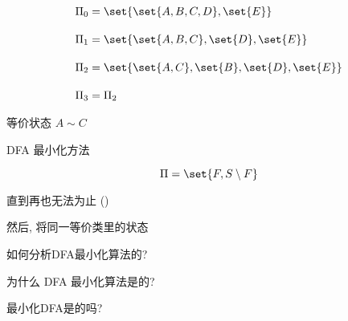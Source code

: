\begin{frame}{}
  \begin{align*}
    \Pi_{0} &= \set{\set{A, B, C, D}, \set{E}} \\[10pt]
    \Pi_{1} &= \set{\set{A, B, C}, \set{D}, \set{E}} \\[10pt]
    \Pi_{2} &= \set{\set{A, C}, \set{B}, \set{D}, \set{E}} \\[10pt]
    \Pi_{3} &= \Pi_{2}
  \end{align*}
\end{frame}

\begin{frame}{}

  \begin{center}
    等价状态 $A \sim C$
  \end{center}


  \pause
  \begin{center}
  \end{center}
\end{frame}

\begin{frame}{}
  \begin{center}
    DFA 最小化方法
  \end{center}

  \[
    \Pi = \set{F, S \setminus F}
  \]
  

  \begin{center}
    直到再也无法为止 \quad ()

    \vspace{0.40cm}
    然后, 将同一等价类里的状态
  \end{center}
\end{frame}

\begin{frame}{}
  \begin{center}
    如何分析DFA最小化算法的?

    \pause
    \vspace{0.60cm}
    为什么 DFA 最小化算法是的?

    \pause
    \vspace{0.60cm}
    最小化DFA是的吗?

    \pause
    \vspace{0.30cm}
  \end{center}
\end{frame}

